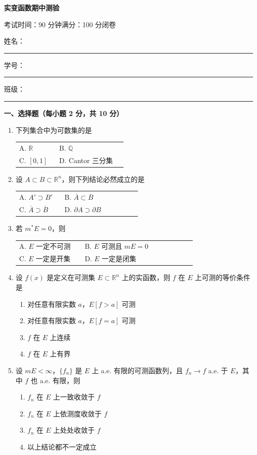 \documentclass[UTF8,11pt,fontset=fandol]{ctexart}
\makeatletter
\newcommand{\examsection}[1]{%
  \par\vspace{0.35em}
  \begin{center}
    \large\bfseries #1
  \end{center}
  \vspace{0.15em}
}
\newcommand{\blank}[1]{\rule[-0.25em]{#1}{0.4pt}}
\newenvironment{twocolchoices}{%
  \par\smallskip
  \begin{tabular}{@{}>{\raggedright\arraybackslash}p{0.33\linewidth}@{\hspace{2em}}>{\raggedright\arraybackslash}p{0.57\linewidth}@{}}%
}{%
  \end{tabular}\par
}
\newenvironment{singlechoices}{%
  \begin{enumerate}[label=\Alph*.,leftmargin=2.1em,itemsep=0pt,topsep=0.15em,parsep=0pt,partopsep=0pt]
}{%
  \end{enumerate}
}
\makeatother
\begin{document}
\begin{center}
  {\LARGE\bfseries 实变函数期中测验}\par
  \vspace{1.7em}
  考试时间：90 分钟\hspace{3em}满分：100 分\hspace{3em}闭卷
\end{center}

\vspace{1.2em}
\noindent
姓名：\blank{4.2cm}\hfill
学号：\blank{4.2cm}\hfill
班级：\blank{4.2cm}

\vspace{1.2em}
\examsection{一、选择题（每小题 2 分，共 10 分）}

\begin{enumerate}
  \item 下列集合中为可数集的是
    \begin{twocolchoices}
      A. $\mathbb{R}$ & B. $\mathbb{Q}$ \\
      C. $[0,1]$ & D. Cantor 三分集
    \end{twocolchoices}

  \item 设 $A\subset B\subset\mathbb{R}^{n}$，则下列结论必然成立的是
    \begin{twocolchoices}
      A. $A'\supset B'$ & B. $\overline{A}\subset\overline{B}$ \\
      C. $\overline{A}\supset\overline{B}$ & D. $\partial A\supset\partial B$
    \end{twocolchoices}

  \item 若 $m^{*}E=0$，则
    \begin{twocolchoices}
      A. $E$ 一定不可测 & B. $E$ 可测且 $mE=0$ \\
      C. $E$ 一定是开集 & D. $E$ 一定是闭集
    \end{twocolchoices}

  \item 设 $f(x)$ 是定义在可测集 $E\subset\mathbb{R}^{n}$ 上的实函数，则 $f$ 在 $E$ 上可测的等价条件是
    \begin{singlechoices}
      \item 对任意有限实数 $a$，$E[f>a]$ 可测
      \item 对任意有限实数 $a$，$E[f=a]$ 可测
      \item $f$ 在 $E$ 上连续
      \item $f$ 在 $E$ 上有界
    \end{singlechoices}

  \item 设 $mE<\infty$，$\{f_n\}$ 是 $E$ 上 a.e. 有限的可测函数列，且
    $f_n\to f$ a.e. 于 $E$，其中 $f$ 也 a.e. 有限，则
    \begin{singlechoices}
      \item $f_n$ 在 $E$ 上一致收敛于 $f$
      \item $f_n$ 在 $E$ 上依测度收敛于 $f$
      \item $f_n$ 在 $E$ 上处处收敛于 $f$
      \item 以上结论都不一定成立
    \end{singlechoices}
\end{enumerate}
\end{document}

